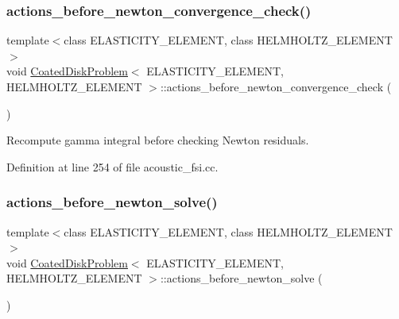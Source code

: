 \subsubsection{\texorpdfstring{actions\+\_\+before\+\_\+newton\+\_\+convergence\+\_\+check()}{actions\_before\_newton\_convergence\_check()}}
{\footnotesize\ttfamily template$<$class E\+L\+A\+S\+T\+I\+C\+I\+T\+Y\+\_\+\+E\+L\+E\+M\+E\+NT, class H\+E\+L\+M\+H\+O\+L\+T\+Z\+\_\+\+E\+L\+E\+M\+E\+NT$>$ \\
void \hyperlink{classCoatedDiskProblem}{Coated\+Disk\+Problem}$<$ E\+L\+A\+S\+T\+I\+C\+I\+T\+Y\+\_\+\+E\+L\+E\+M\+E\+NT, H\+E\+L\+M\+H\+O\+L\+T\+Z\+\_\+\+E\+L\+E\+M\+E\+NT $>$\+::actions\+\_\+before\+\_\+newton\+\_\+convergence\+\_\+check (\begin{DoxyParamCaption}{ }\end{DoxyParamCaption})\hspace{0.3cm}{\ttfamily [inline]}}



Recompute gamma integral before checking Newton residuals. 



Definition at line 254 of file acoustic\+\_\+fsi.\+cc.

\mbox{\label{classCoatedDiskProblem_a3b94aaddee6a8f386ba249f418813963}} 
\subsubsection{\texorpdfstring{actions\+\_\+before\+\_\+newton\+\_\+solve()}{actions\_before\_newton\_solve()}\hspace{0.1cm}{\footnotesize\ttfamily [1/2]}}
{\footnotesize\ttfamily template$<$class E\+L\+A\+S\+T\+I\+C\+I\+T\+Y\+\_\+\+E\+L\+E\+M\+E\+NT, class H\+E\+L\+M\+H\+O\+L\+T\+Z\+\_\+\+E\+L\+E\+M\+E\+NT$>$ \\
void \hyperlink{classCoatedDiskProblem}{Coated\+Disk\+Problem}$<$ E\+L\+A\+S\+T\+I\+C\+I\+T\+Y\+\_\+\+E\+L\+E\+M\+E\+NT, H\+E\+L\+M\+H\+O\+L\+T\+Z\+\_\+\+E\+L\+E\+M\+E\+NT $>$\+::actions\+\_\+before\+\_\+newton\+\_\+solve (\begin{DoxyParamCaption}{ }\end{DoxyParamCaption})\hspace{0.3cm}{\ttfamily [inline]}}



